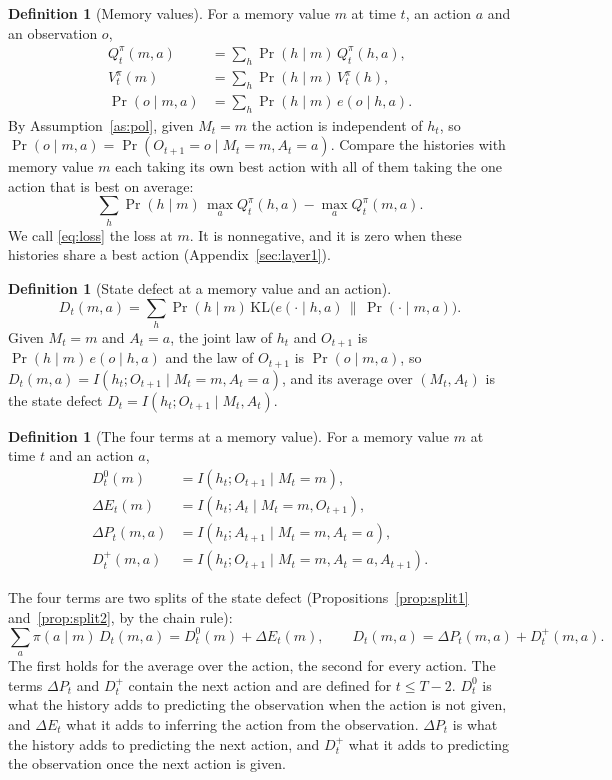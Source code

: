 \documentclass{article}
\theoremstyle{definition}
\newtheorem{definition}[proposition]{Definition}
\newcommand{\KL}{\mathrm{KL}}
\newcommand{\dE}{\Delta E}
\newcommand{\dP}{\Delta P}
\begin{document}
\begin{definition}[Memory values]\label{def:memvalue}
For a memory value $m$ at time $t$, an action $a$ and an observation $o$,
\begin{align*}
Q^\pi_t(m,a)&=\sum_h\Pr(h\mid m)\,Q^\pi_t(h,a),\\
V^\pi_t(m)&=\sum_h\Pr(h\mid m)\,V^\pi_t(h),\\
\Pr(o\mid m,a)&=\sum_h\Pr(h\mid m)\,e(o\mid h,a).
\end{align*}
By Assumption~\ref{as:pol}, given $M_t=m$ the action is independent of $h_t$, so $\Pr(o\mid m,a)=\Pr(O_{t+1}=o\mid M_t=m,A_t=a)$. Compare the histories with memory value $m$ each taking its own best action with all of them taking the one action that is best on average:
\begin{equation}\label{eq:loss}
\sum_h\Pr(h\mid m)\,\max_aQ^\pi_t(h,a)-\max_aQ^\pi_t(m,a).
\end{equation}
We call \eqref{eq:loss} the loss at $m$. It is nonnegative, and it is zero when these histories share a best action (Appendix~\ref{sec:layer1}).
\end{definition}

\begin{definition}[State defect at a memory value and an action]\label{def:D}
\[
D_t(m,a)=\sum_h\Pr(h\mid m)\,\KL\big(e(\cdot\mid h,a)\,\big\|\,\Pr(\cdot\mid m,a)\big).
\]
Given $M_t=m$ and $A_t=a$, the joint law of $h_t$ and $O_{t+1}$ is $\Pr(h\mid m)\,e(o\mid h,a)$ and the law of $O_{t+1}$ is $\Pr(o\mid m,a)$, so $D_t(m,a)=I(h_t;O_{t+1}\mid M_t=m,A_t=a)$, and its average over $(M_t,A_t)$ is the state defect $D_t=I(h_t;O_{t+1}\mid M_t,A_t)$.
\end{definition}

\begin{definition}[The four terms at a memory value]\label{def:four-terms}
For a memory value $m$ at time $t$ and an action $a$,
\begin{align*}
D^0_t(m)&=I(h_t;O_{t+1}\mid M_t=m),\\
\dE_t(m)&=I(h_t;A_t\mid M_t=m,O_{t+1}),\\
\dP_t(m,a)&=I(h_t;A_{t+1}\mid M_t=m,A_t=a),\\
D^+_t(m,a)&=I(h_t;O_{t+1}\mid M_t=m,A_t=a,A_{t+1}).
\end{align*}
\end{definition}

The four terms are two splits of the state defect (Propositions~\ref{prop:split1} and~\ref{prop:split2}, by the chain rule):
\[
\sum_a\pi(a\mid m)\,D_t(m,a)=D^0_t(m)+\dE_t(m),\qquad D_t(m,a)=\dP_t(m,a)+D^+_t(m,a).
\]
The first holds for the average over the action, the second for every action. The terms $\dP_t$ and $D^+_t$ contain the next action and are defined for $t\le T-2$. $D^0_t$ is what the history adds to predicting the observation when the action is not given, and $\dE_t$ what it adds to inferring the action from the observation. $\dP_t$ is what the history adds to predicting the next action, and $D^+_t$ what it adds to predicting the observation once the next action is given.
\end{document}
